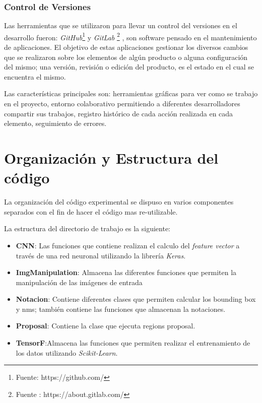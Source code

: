 \subsubsection*{Control de Versiones}

Las herramientas que se utilizaron para llevar un control del versiones en el desarrollo fueron: \textit{GitHub}\footnote{Fuente: https://github.com/} y \textit{GitLab} \footnote{Fuente : https://about.gitlab.com/} , son software pensado en el mantenimiento de aplicaciones. El objetivo de estas aplicaciones gestionar los diversos cambios que se realizaron sobre los elementos de algún producto o alguna configuración del mismo; una versión, revisión o edición del producto, es el estado en el cual se encuentra el mismo.

Las características principales son: herramientas gráficas para ver como se trabajo en el proyecto, entorno colaborativo permitiendo a diferentes desarrolladores compartir sus trabajos, registro histórico de cada acción realizada en cada elemento, seguimiento de errores.

\section{Organización y Estructura del código}\label{sec:estructuracodigo}

La organización del código experimental se dispuso en varios componentes separados con el fin de hacer el código mas re-utilizable.

La estructura del directorio de trabajo es la siguiente:
\begin{itemize}
 \item \textbf{CNN}: Las funciones que contiene realizan el calculo del \textit{feature vector} a través de una red neuronal utilizando la librería 
\textit{Keras}.
 \item \textbf{ImgManipulation}: Almacena las diferentes funciones que permiten la manipulación de las imágenes de entrada 
 \item \textbf{Notacion}: Contiene diferentes clases que permiten calcular los bounding box y \ac{nms}; también contiene las funciones que almacenan 
la notaciones.
 \item \textbf{Proposal}: Contiene la clase que ejecuta regions proposal.
 \item \textbf{TensorF}:Almacena las funciones que permiten realizar el entrenamiento de los datos utilizando \textit{Scikit-Learn}.
\end{itemize}

